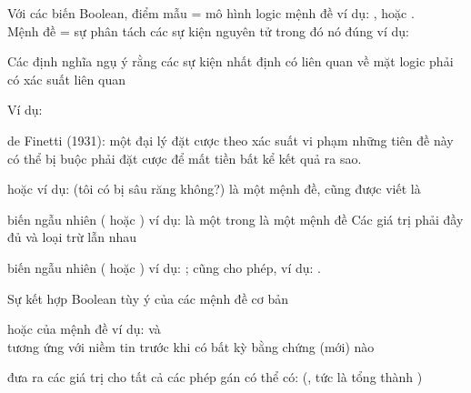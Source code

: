 \documentclass{article}
\begin{document}
\begin{huge}
Với các biến Boolean, điểm mẫu = mô hình logic mệnh đề\nl
  ví dụ: ,  hoặc .\\
Mệnh đề = sự phân tách các sự kiện nguyên tử trong đó nó đúng\al
ví dụ: \al
{}



Các định nghĩa ngụ ý rằng các sự kiện nhất định có liên quan về mặt logic
phải có xác suất liên quan

Ví dụ: 

\vspace*{0.2in}

\textwidth
{}

de Finetti (1931): một đại lý đặt cược theo xác suất vi phạm
những tiên đề này có thể bị buộc phải đặt cược để mất tiền bất kể kết quả ra sao.


 hoặc \al
  ví dụ:  (tôi có bị sâu răng không?)\al
   là một mệnh đề, cũng được viết là 

 biến ngẫu nhiên ( hoặc ) \al
  ví dụ:  là một trong \al
   là một mệnh đề\al
Các giá trị phải đầy đủ và loại trừ lẫn nhau

 biến ngẫu nhiên ( hoặc )\al
  ví dụ: ; cũng cho phép, ví dụ: .

Sự kết hợp Boolean tùy ý của các mệnh đề cơ bản


 hoặc  của mệnh đề\al
  ví dụ:  và \\
tương ứng với niềm tin trước khi có bất kỳ bằng chứng (mới) nào

 đưa ra các giá trị cho tất cả các phép gán có thể có:\al
   (, tức là 
       tổng thành )


\end{huge}
\end{document}
